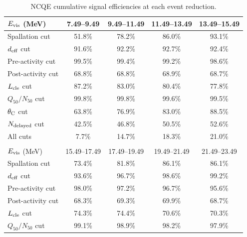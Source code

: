 \begin{table}[h]
	\centering
	\caption[NCQE cumulative signal efficiencies at each event reduction]{
	NCQE cumulative signal efficiencies at each event reduction.
	}\label{tab:eff}
	\vs
	\begin{tabular}{lcccc} \hline \hline
		$E_{\rm vis}$ (MeV)   & 7.49--9.49   & 9.49--11.49  & 11.49--13.49 & 13.49--15.49 \\ \hline
		Spallation cut        & 51.8\%       & 78.2\%       & 86.0\%       & 93.1\%       \\
		$d_{\rm eff}$ cut     & 91.6\%       & 92.2\%       & 92.7\%       & 92.4\%       \\
		Pre-activity cut      & 99.5\%       & 99.4\%       & 99.2\%       & 98.6\%       \\
		Post-activity cut     & 68.8\%       & 68.8\%       & 68.9\%       & 68.7\%       \\
		$L_{\rm cle}$ cut     & 87.2\%       & 83.0\%       & 80.4\%       & 77.8\%       \\
		$Q_{50}/N_{50}$ cut   & 99.8\%       & 99.8\%       & 99.6\%       & 99.5\%       \\
		$\theta_{\rm C}$ cut  & 63.8\%       & 76.9\%       & 83.0\%       & 88.5\%       \\
		$N_{\rm delayed}$ cut & 42.5\%       & 46.8\%       & 50.5\%       & 52.6\%       \\ \hline
		All cuts              &  7.7\%       & 14.7\%       & 18.3\%       & 21.0\%       \\ \hline \hline
		                      &              &              &              &              \\ \hline \hline
		$E_{\rm vis}$ (MeV)   & 15.49--17.49 & 17.49--19.49 & 19.49--21.49 & 21.49--23.49 \\ \hline
		Spallation cut        & 73.4\%       & 81.8\%       & 86.1\%       & 86.1\%       \\
		$d_{\rm eff}$ cut     & 93.6\%       & 96.7\%       & 98.6\%       & 99.2\%       \\
		Pre-activity cut      & 98.0\%       & 97.2\%       & 96.7\%       & 95.6\%       \\
		Post-activity cut     & 68.3\%       & 69.3\%       & 69.9\%       & 68.7\%       \\
		$L_{\rm cle}$ cut     & 74.3\%       & 74.4\%       & 70.6\%       & 70.3\%       \\
		$Q_{50}/N_{50}$ cut   & 99.1\%       & 98.9\%       & 98.2\%       & 97.9\%       \\

\end{tabular}
\end{table}
